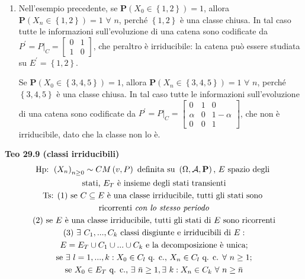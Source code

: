 \documentclass{article}
\begin{document}
\begin{enumerate}
\item Nell'esempio precedente, se $\mathbf{P}\left( X_{0}\in \left\{
1,2\right\} \right) =1$, allora $\mathbf{P}\left( X_{n}\in \left\{
1,2\right\} \right) =1$ $\forall $ $n$, perch\'{e} $\left\{ 1,2\right\} $ 
\`{e} una classe chiusa. In tal caso tutte le informazioni sull'evoluzione
di una catena sono codificate da $P^{\prime }=P|_{C}=\left[ 
\begin{array}{cc}
0 & 1 \\ 
1 & 0%
\end{array}%
\right] $, che peraltro \`{e} irriducibile: la catena pu\`{o} essere
studiata su $E^{\prime }=\left\{ 1,2\right\} $.

Se $\mathbf{P}\left( X_{0}\in \left\{ 3,4,5\right\} \right) =1$, allora $%
\mathbf{P}\left( X_{n}\in \left\{ 3,4,5\right\} \right) =1$ $\forall $ $n$,
perch\'{e} $\left\{ 3,4,5\right\} $ \`{e} una classe chiusa. In tal caso
tutte le informazioni sull'evoluzione di una catena sono codificate da $%
P^{\prime }=P|_{C}=\left[ 
\begin{array}{ccc}
0 & 1 & 0 \\ 
\alpha & 0 & 1-\alpha \\ 
0 & 0 & 1%
\end{array}%
\right] $, che non \`{e} irriducibile, dato che la classe non lo \`{e}.
\end{enumerate}

\textbf{Teo 29.9 (classi irriducibili)}%
\begin{gather*}
\text{Hp: }\left( X_{n}\right) _{n\geq 0}\sim CM\left( v,P\right) \text{
definita su }\left( \Omega ,\mathcal{A},\mathbf{P}\right) \text{, }E\text{
spazio degli } \\
\text{stati, }E_{T}\text{ \`{e} insieme degli stati transienti} \\
\text{Ts: (1) se }C\subseteq E\text{ \`{e} una classe irriducibile, tutti
gli stati sono } \\
\text{ricorrenti \textit{con lo stesso periodo}} \\
\text{(2) se }E\text{ \`{e} una classe irriducibile, tutti gli stati di }E%
\text{ sono ricorrenti} \\
\text{(3) }\exists \text{ }C_{1},...,C_{k}\text{ classi disgiunte e
irriducibili di }E: \\
E=E_{T}\cup C_{1}\cup ...\cup C_{k}\text{ e la decomposizione \`{e} unica;}
\\
\text{se }\exists \text{ }l=1,...,k:X_{0}\in C_{l}\text{ q. c., }X_{n}\in
C_{l}\text{ q. c. }\forall \text{ }n\geq 1\text{;} \\
\text{se }X_{0}\in E_{T}\text{ q. c., }\exists \text{ }\bar{n}\geq 1,\exists 
\text{ }k:X_{n}\in C_{k}\text{ }\forall \text{ }n\geq \bar{n}
\end{gather*}
\end{document}
